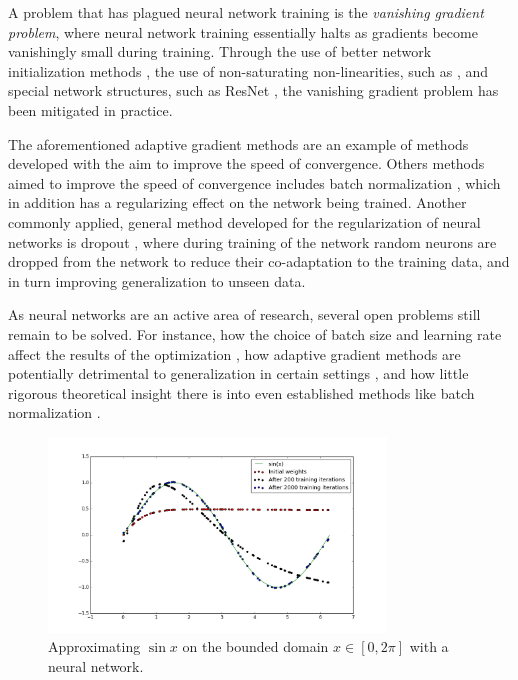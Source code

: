 A problem that has plagued neural network training is the \textit{vanishing gradient problem}, where neural network training essentially halts as gradients become vanishingly small during training. Through the use of better network initialization methods \cite{xavier_initializer}, the use of non-saturating non-linearities, such as \cite{relu}, and special network structures, such as ResNet \cite{resnet}, the vanishing gradient problem has been mitigated in practice.

The aforementioned adaptive gradient methods are an example of methods developed with the aim to improve the speed of convergence. Others methods aimed to improve the speed of convergence includes batch normalization \cite{batch_normalization}, which in addition has a regularizing effect on the network being trained. Another commonly applied, general method developed for the regularization of neural networks is dropout \cite{dropout}, where during training of the network random neurons are dropped from the network to reduce their co-adaptation to the training data, and in turn improving generalization to unseen data.

As neural networks are an active area of research, several open problems still remain to be solved. For instance, how the choice of batch size and learning rate affect the results of the optimization \cite{large_batch_size_generalization, learning_rate_vs_batch_size}, how adaptive gradient methods are potentially detrimental to generalization in certain settings \cite{marginal_value_of_adaptive_gradient_methods}, and how little rigorous theoretical insight there is into even established methods like batch normalization \cite{how_batch_norm_works}.

\begin{figure}[!htb]
  \centering
  \includegraphics[width=0.8\textwidth]{images/function_approximation.png}
  \caption{Approximating $\sin x$ on the bounded domain $x \in [0, 2\pi]$ with a neural network.}
  \label{fig:function_approximation}
\end{figure}

